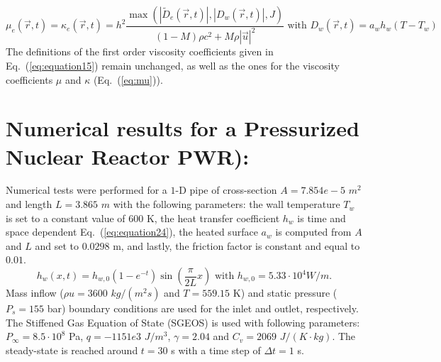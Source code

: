 \documentclass{article}
\newcommand{\eqt}[1]{Eq.~(\ref{#1})}                     %
\begin{document}
\begin{equation}
\label{eq:equation21}
\mu_e(\vec{r},t) = \kappa_e(\vec{r},t) = h^2 \frac{\max\left( | \tilde{D}_e(\vec{r},t) |, | D_w(\vec{r},t) |, J \right)}{(1-M) \rho c^2 + M \rho |\vec{u}|^2} \text{ with } D_w(\vec{r},t) = a_w h_w (T - T_w)
\end{equation}
The definitions of the first order viscosity coefficients given in \eqt{eq:equation15} remain unchanged, as well as the ones for the viscosity coefficients $\mu$ and $\kappa$ (\eqt{eq:mu}).
\section{Numerical results for a Pressurized Nuclear Reactor PWR):}
Numerical tests were performed for a $1$-D pipe of cross-section $A = 7.854e-5$ $m^2$ and length $L=3.865$ $m$ with the following parameters: the wall temperature $T_w$ is set to a constant value of $600$ K, the heat transfer coefficient $h_w$ is time and space dependent \eqt{eq:equation24}, the heated surface $a_w$ is computed from $A$ and $L$ and set to $0.0298$ m, and lastly, the friction factor is constant and equal to $0.01$.
\begin{equation}
\label{eq:equation24}
h_w(x,t) = h_{w,0}(1-e^{-t})\sin \left( \frac{\pi}{2L} x\right) \text{ with } h_{w,0} = 5.33 \cdot 10^4 W / m.
\end{equation}
Mass inflow ($\rho u = 3600$ $kg/(m^2 s)$ and $T = 559.15$ K) and static pressure ($P_s = 155$ bar) boundary conditions are used for the inlet and outlet, respectively. The Stiffened Gas Equation of State (SGEOS) is used \cite{SGEOS} with following parameters: $P_{\infty} = 8.5 \cdot 10^8$ Pa, $q = -1151e3$ $J/m^3$, $\gamma = 2.04$ and $C_v = 2069$ $J/(K \cdot kg)$. The steady-state is reached around $t=30$ s with a time step of $\Delta t = 1$ s. 
\end{document}
